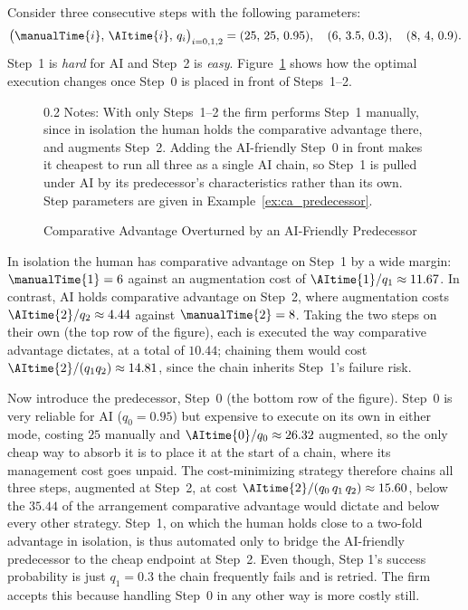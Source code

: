 \begin{example}
\label{ex:ca_predecessor}
Consider three consecutive steps with the following parameters:
\[ \bigl(\manualTime{i},\, \AItime{i},\, q_i\bigr)_{i=0,1,2} = (25,\,25,\,0.95),\quad (6,\,3.5,\,0.3),\quad (8,\,4,\,0.9). \]
Step~1 is \emph{hard} for AI and Step~2 is \emph{easy}.
Figure~\ref{fig:ex_predecessor} shows how the optimal execution changes once Step~0 is placed in front of Steps~1--2.
\begin{figure}[!t]
\caption{Comparative Advantage Overturned by an AI-Friendly Predecessor}
\label{fig:ex_predecessor}
\centering

\par\vspace{\fignotesskip}
\begin{minipage}{1\linewidth}
\begin{spacing}{0.2}
{\fontsize{9.5pt}{10pt}\selectfont Notes: With only Steps~1--2 the firm performs Step~1 manually, since in isolation the human holds the comparative advantage there, and augments Step~2. Adding the AI-friendly Step~0 in front makes it cheapest to run all three as a single AI chain, so Step~1 is pulled under AI by its predecessor's characteristics rather than its own. Step parameters are given in Example~\ref{ex:ca_predecessor}.}
\end{spacing}
\end{minipage}
\end{figure}
In isolation the human has comparative advantage on Step~1 by a wide margin: $\manualTime{1} = 6$ against an augmentation cost of $\AItime{1}/q_1 \approx 11.67$. 
In contrast, AI holds comparative advantage on Step~2, where augmentation costs $\AItime{2}/q_2 \approx 4.44$ against $\manualTime{2} = 8$.
Taking the two steps on their own (the top row of the figure), each is executed the way comparative advantage dictates, at a total of $10.44$; chaining them would cost $\AItime{2}/(q_1 q_2) \approx 14.81$, since the chain inherits Step~1's failure risk.

Now introduce the predecessor, Step~0 (the bottom row of the figure).
Step~0 is very reliable for AI ($q_0 = 0.95$) but expensive to execute on its own in either mode, costing $25$ manually and $\AItime{0}/q_0 \approx 26.32$ augmented, so the only cheap way to absorb it is to place it at the start of a chain, where its management cost goes unpaid.
The cost-minimizing strategy therefore chains all three steps, augmented at Step~2, at cost $\AItime{2}/(q_0\, q_1\, q_2) \approx 15.60$, below the $35.44$ of the arrangement comparative advantage would dictate and below every other strategy.
Step~1, on which the human holds close to a two-fold advantage in isolation, is thus automated only to bridge the AI-friendly predecessor to the cheap endpoint at Step~2.
Even though, Step 1's success probability is just $q_1 = 0.3$ the chain frequently fails and is retried. 
The firm accepts this because handling Step~0 in any other way is more costly still.
\end{example}


